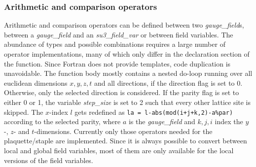 \documentclass[graybox]{svmult}
\begin{document}
\subsubsection*{Arithmetic and comparison operators}

Arithmetic and comparison operators can be defined between two \emph{gauge\_field}s, between a \emph{gauge\_field} and an \emph{su3\_field\_var} or between field variables. The abundance of types and possible combinations requires a large number of operator implementations, many of which only differ in the declaration section of the function. Since Fortran does not provide templates, code duplication is unavoidable. The function body mostly contains a nested do-loop running over all euclidean dimensions $x,y,z,t$ and all directions, if the direction flag is set to 0. Otherwise, only the selected direction is considered. If the parity flag is set to either 0 or 1, the variable \emph{step\_size} is set to 2 such that every other lattice site is skipped. The $x$-index $l$ gets redefined as \lstinline{la = l-abs(mod(i+j+k,2)-a%par)}{} according to the selected parity, where $a$ is the \emph{gauge\_field} and $k,j,i$ index the $y$-, $z$- and $t$-dimensions. Currently only those operators needed for the plaquette/staple are implemented. Since it is always possible to convert between local and global field variables, most of them are only available for the local versions of the field variables.
\end{document}
